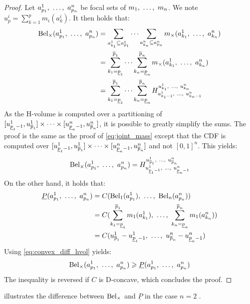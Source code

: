\begin{proof}
    Let $a^1_{p_1} , ~\dots, ~ a^n_{p_n}$ be focal sets of $m_1 , ~\dots, ~ m_n$. We note $u^i_p=\sum_{k=1}^p m_i(a^i_k)$. It then holds that:
    \begin{align*}
        \mathrm{Bel}_\times(a^1_{p_1} , ~\dots, ~ a^n_{p_n}) &= \sum_{a^1_{k_1}\subseteq a^1_{p_1}}\dots\sum_{a^n_{k_n}\subseteq a^n_{p_n}}m_\times(a^1_{k_1} , ~\dots, ~  a^n_{k_n})\\
        &= \sum_{k_1=\underline{p}_1}^{\overline{p}_1}\dots\sum_{k_n=\underline{p}_n}^{\overline{p}_n}m_\times(a^1_{k_1} , ~\dots, ~  a^n_{k_n})\\
        &= \sum_{k_1=\underline{p}_1}^{\overline{p}_1}\dots\sum_{k_n=\underline{p}_n}^{\overline{p}_n}H_{u^1_{k_1-1} , ~\dots, ~ u^n_{k_n-1}}^{u^1_{k_1} , ~\dots, ~ u^n_{k_n}}
    \end{align*}
    As the H-volume is computed over a partitioning of $[u^1_{\underline{p}_1-1}, u^1_{\overline{p}_1}]\times\dots\times[u^n_{\underline{p}_n-1} , u^n_{\overline{p}_n}]$, it is possible to greatly simplify the sums. The proof is the same as the proof of \eqref{eq:joint_mass} except that the CDF is computed over $[u^1_{\underline{p}_1-1}, u^1_{\overline{p}_1}]\times\dots\times[u^n_{\underline{p}_n-1} , u^n_{\overline{p}_n}]$ and not $[0,1]^n$. This yields:
    \begin{align*}
        \mathrm{Bel}_\times(a^1_{p_1} , ~\dots, ~ a^n_{p_n}) = H_{u^1_{\underline{p}_1-1} , ~\dots, ~ u^n_{\underline{p}_n-1}}^{u^1_{\overline{p}_1} , ~\dots, ~ u^n_{\overline{p}_n}}
    \end{align*}
    On the other hand, it holds that:
    \begin{align*}
        \underline{P}(a^1_{p_1} , ~\dots, ~ a^n_{p_n}) &= C(\mathrm{Bel}_1(a^1_{p_1}) , ~\dots, ~ \mathrm{Bel}_n(a^n_{p_n}))\\
        &= C(\sum_{k_1=\underline{p}_1}^{\overline{p}_1} m_1(a^1_{k_1}) , ~\dots, ~ \sum_{k_n=\underline{p}_n}^{\overline{p}_n} m_1(a^n_{k_n}))\\
        &= C(u^1_{\overline{p}_1} - u^1_{\underline{p}_1-1} , ~\dots, ~ u^n_{\overline{p}_n} - u^n_{\underline{p}_n-1})
    \end{align*}
    Using \cref{eq:convex_diff_hvol} yields:
    \begin{align*}
        \mathrm{Bel}_\times(a^1_{p_1} , ~\dots, ~ a^n_{p_n}) \geqslant \underline{P}(a^1_{p_1} , ~\dots, ~ a^n_{p_n})
    \end{align*}
    The inequality is reversed if $C$ is D-concave, which concludes the proof.
\end{proof}

 illustrates the difference between $\mathrm{Bel}_\times$ and $\underline{P}$ in the case $n=2$    .


